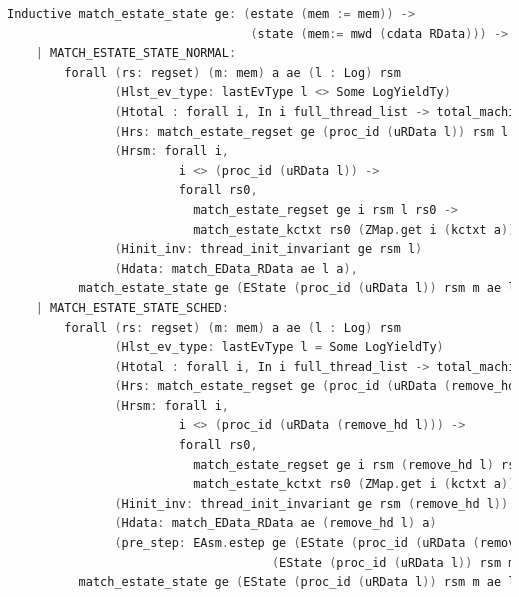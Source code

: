 \begin{lstlisting}[language=C]
    Inductive match_estate_state ge: (estate (mem := mem)) -> 
                                  (state (mem:= mwd (cdata RData))) -> Prop :=
    | MATCH_ESTATE_STATE_NORMAL:
        forall (rs: regset) (m: mem) a ae (l : Log) rsm
               (Hlst_ev_type: lastEvType l <> Some LogYieldTy)
               (Htotal : forall i, In i full_thread_list -> total_machine_regset i rsm)
               (Hrs: match_estate_regset ge (proc_id (uRData l)) rsm l rs) (* my regset *)
               (Hrsm: forall i,
                        i <> (proc_id (uRData l)) ->
                        forall rs0,
                          match_estate_regset ge i rsm l rs0 ->
                          match_estate_kctxt rs0 (ZMap.get i (kctxt a))) (* others' regset will be remained as same *)
               (Hinit_inv: thread_init_invariant ge rsm l)
               (Hdata: match_EData_RData ae l a), 
          match_estate_state ge (EState (proc_id (uRData l)) rsm m ae l) (State rs (m, a))
    | MATCH_ESTATE_STATE_SCHED:
        forall (rs: regset) (m: mem) a ae (l : Log) rsm
               (Hlst_ev_type: lastEvType l = Some LogYieldTy)
               (Htotal : forall i, In i full_thread_list -> total_machine_regset i rsm)
               (Hrs: match_estate_regset ge (proc_id (uRData (remove_hd l))) rsm (remove_hd l) rs) (* my regset *)
               (Hrsm: forall i,
                        i <> (proc_id (uRData (remove_hd l))) ->
                        forall rs0,
                          match_estate_regset ge i rsm (remove_hd l) rs0 ->
                          match_estate_kctxt rs0 (ZMap.get i (kctxt a))) (* others' regset will be remained as same *)
               (Hinit_inv: thread_init_invariant ge rsm (remove_hd l))
               (Hdata: match_EData_RData ae (remove_hd l) a)
               (pre_step: EAsm.estep ge (EState (proc_id (uRData (remove_hd l))) rsm m ae (remove_hd l)) E0
                                     (EState (proc_id (uRData l)) rsm m ae l)),
          match_estate_state ge (EState (proc_id (uRData l)) rsm m ae l) (State rs (m, a)).
\end{lstlisting}

